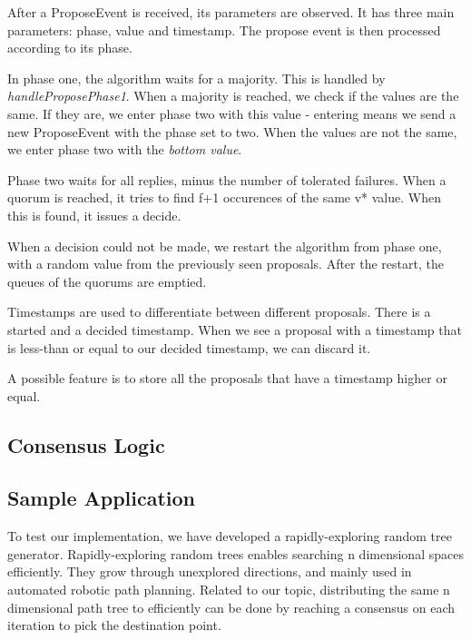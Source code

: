 \documentclass[times, 12pt,twocolumn]{article}
\begin{document}
After a ProposeEvent is received, its parameters are observed. It has three main 
parameters: phase, value and timestamp. The propose event is then processed according 
to its phase.

In phase one, the algorithm waits for a majority. This is handled by 
\textit{handleProposePhase1}. When a majority is reached, we check if the values 
are the same. If they are, we enter phase two with this value - entering means 
we send a new ProposeEvent with the phase set to two. When the values are not the 
same, we enter phase two with the \textit{bottom value}.

Phase two waits for all replies, minus the number of tolerated failures. 
When a quorum is reached, it tries to find f+1 occurences of the same v* value. 
When this is found, it issues a decide.

When a decision could not be made, we restart the algorithm from phase one, with 
a random value from the previously seen proposals. After the restart, the 
queues of the quorums are emptied.

Timestamps are used to differentiate between different proposals. There is a started 
and a decided timestamp. When we see a proposal with a timestamp that is less-than 
or equal to our decided timestamp, we can discard it. 

A possible feature is to store all the proposals that have a timestamp higher or equal.



\subsection{Consensus Logic}

\subsection{Sample Application}

To test our implementation, we have developed a rapidly-exploring random tree generator. Rapidly-exploring random trees\cite{Lavalle98rapidly-exploringrandom} enables searching n dimensional spaces efficiently. They grow through unexplored directions, and mainly used in automated robotic path planning. Related to our topic, distributing the same n dimensional path tree to efficiently can be done by reaching a consensus on each iteration to pick the destination point.
\end{document}

